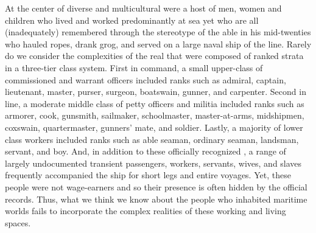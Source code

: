 At the center of diverse and multicultural  were a host of men, women and children who lived and worked predominantly at sea yet who are all (inadequately) remembered through the stereotype of the able  in his mid-twenties who hauled ropes, drank grog, and served on a large naval ship of the line. Rarely do we consider the complexities of the real  that were composed of ranked strata in a three-tier class system. First in command, a small upper-class of commissioned and warrant officers included ranks such as admiral, captain, lieutenant, master, purser, surgeon, boatswain, gunner, and carpenter. Second in line, a moderate middle class of petty officers and militia included ranks such as armorer, cook, gunsmith, sailmaker, schoolmaster, master-at-arms, midshipmen, coxswain, quartermaster, gunners’ mate, and soldier. Lastly, a majority of lower class workers included ranks such as able seaman, ordinary seaman, landsman, servant, and boy. And, in addition to these officially recognized , a range of largely undocumented transient passengers, workers, servants, wives, and slaves frequently accompanied the ship for short legs and entire voyages. Yet, these people were not wage-earners and so their presence is often hidden by the official records. Thus, what we think we know about the people who inhabited maritime worlds fails to incorporate the complex realities of these working and living spaces.  



